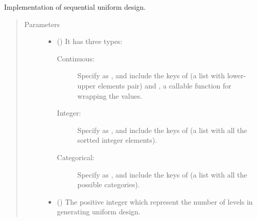 \documentclass[letterpaper,10pt,english]{sphinxmanual}
\begin{document}
\begin{fulllineitems}
\label{\detokenize{apidoc:pysequd.sequd.SeqUD}}
Implementation of sequential uniform design.
\begin{quote}\begin{description}
\item[{Parameters}] \leavevmode\begin{itemize}
\item {} 
 () \textendash{} 
It has three types:
\begin{description}
\item[{Continuous: }] \leavevmode
Specify  as , and include the keys of  (a list with lower-upper elements pair) and
, a callable function for wrapping the values.

\item[{Integer:}] \leavevmode
Specify  as , and include the keys of  (a list with all the sortted integer elements).

\item[{Categorical:}] \leavevmode
Specify  as , and include the keys of  (a list with all the possible categories).

\end{description}


\item {} 
 (\sphinxstyleliteralemphasis{\sphinxupquote{, }}\sphinxstyleliteralemphasis{\sphinxupquote{, }}) \textendash{} The positive integer which represent the number of levels in generating uniform design.


\end{itemize}
\end{description}
\end{quote}
\end{fulllineitems}
\end{document}
